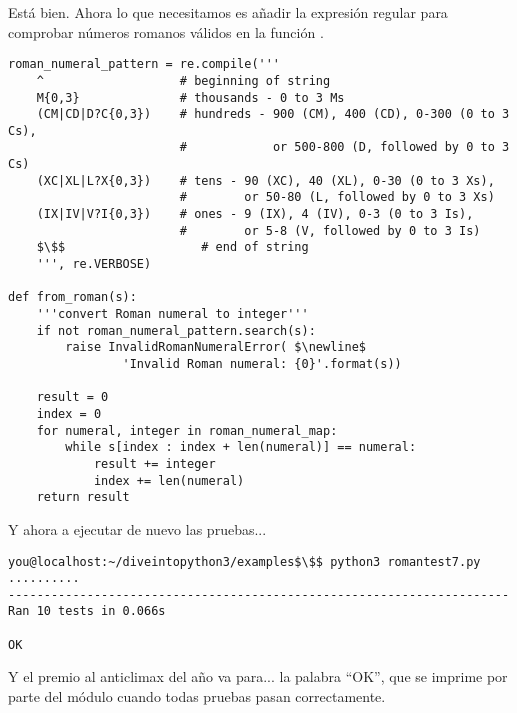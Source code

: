 Está bien. Ahora lo que necesitamos es añadir la expresión regular para comprobar números romanos válidos en la función .

\noindent\begin{minipage}{\textwidth}
\begin{lstlisting}[mathescape=True]
roman_numeral_pattern = re.compile('''
    ^                   # beginning of string
    M{0,3}              # thousands - 0 to 3 Ms
    (CM|CD|D?C{0,3})    # hundreds - 900 (CM), 400 (CD), 0-300 (0 to 3 Cs),
                        #            or 500-800 (D, followed by 0 to 3 Cs)
    (XC|XL|L?X{0,3})    # tens - 90 (XC), 40 (XL), 0-30 (0 to 3 Xs),
                        #        or 50-80 (L, followed by 0 to 3 Xs)
    (IX|IV|V?I{0,3})    # ones - 9 (IX), 4 (IV), 0-3 (0 to 3 Is),
                        #        or 5-8 (V, followed by 0 to 3 Is)
    $\$$                   # end of string
    ''', re.VERBOSE)

def from_roman(s):
    '''convert Roman numeral to integer'''
    if not roman_numeral_pattern.search(s):
        raise InvalidRomanNumeralError( $\newline$
                'Invalid Roman numeral: {0}'.format(s))

    result = 0
    index = 0
    for numeral, integer in roman_numeral_map:
        while s[index : index + len(numeral)] == numeral:
            result += integer
            index += len(numeral)
    return result
\end{lstlisting}
\end{minipage}

Y ahora a ejecutar de nuevo las pruebas...

\noindent\begin{minipage}{\textwidth}
\begin{lstlisting}[mathescape=True]
you@localhost:~/diveintopython3/examples$\$$ python3 romantest7.py
..........
----------------------------------------------------------------------
Ran 10 tests in 0.066s

OK
\end{lstlisting}
\end{minipage}

Y el premio al anticlimax del año va para... la palabra ``OK'', que se imprime por parte del módulo  cuando todas pruebas pasan correctamente.

